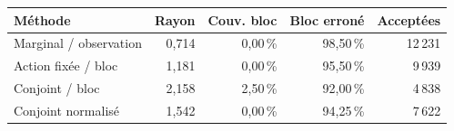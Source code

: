 \begin{tabularx}{\linewidth}{@{}Yrrrr@{}}
\toprule
Méthode & Rayon & Couv. bloc & Bloc erroné & Acceptées\\
\midrule
Marginal / observation & 0,714 & 0,00\,\% & 98,50\,\% & 12\,231\\
Action fixée / bloc & 1,181 & 0,00\,\% & 95,50\,\% & 9\,939\\
Conjoint / bloc & 2,158 & 2,50\,\% & 92,00\,\% & 4\,838\\
Conjoint normalisé & 1,542 & 0,00\,\% & 94,25\,\% & 7\,622\\
\bottomrule
\end{tabularx}